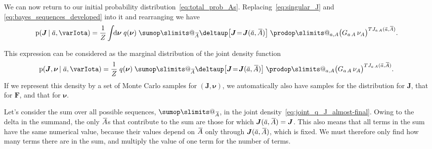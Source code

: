 \documentclass[\ifafour a4paper,12pt,\else a5paper,10pt,\fi%
onecolumn,oneside,article,%
british%
]{memoir}
\makeatletter
\theoremstyle{remark}
\theoremstyle{innote}
\def\sum{\DOTSI\sumop\slimits@}
\def\prod{\DOTSI\prodop\slimits@}
\newcommand*{\delt}{\deltaup}%
\newcommand*{\di}{\mathrm{d}}%
\newcommand*{\pf}{\mathrm{p}}%
\renewcommand*{\|}[1][]{\nonscript\,#1\vert\nonscript\;\mathopen{}}
\newcommand*{\widebar}[1]{{\mkern1.5mu\skew{2}\overline{\mkern-1.5mu#1\mkern-1.5mu}\mkern 1.5mu}}
\newcommand*{\yFF}{F}
\newcommand*{\yF}{\bm{\yFF}}
\newcommand*{\yAs}{\widebar{A}}%
\newcommand*{\yas}{\widebar{a}}%
\newcommand*{\yI}{\varIota}
\newcommand*{\yJJ}{J}
\newcommand*{\yJ}{\bm{\yJJ}}
\newcommand*{\ynuu}{\nu}
\newcommand*{\ynu}{\bm{\ynuu}}
\newcommand*{\yeq}{\mathrel{\!=\!}}
\makeatother
\begin{document}
\bigskip

We can now return to our initial probability
distribution~\eqref{eq:total_prob_As}. Replacing~\eqref{eq:singular_J} and
\eqref{eq:bayes_sequences_developed} into it and rearranging we have
\begin{equation}
  \label{eq:next-final_expression}
    \pf(\yJ \| \yas, \yI) =
  \frac{1}{Z}
  \int\!\!\di\ynu\;q(\ynu)\;
  \sum_{\yAs}\delt\bigl[\yJ \yeq \yJ(\yas,\yAs)\bigr]\;
  \prod_{a,A} \bigl(G_{a\,A}\,\nu_{A}\bigr)^{T J_{a\,A}(\yas,\yAs)}.
\end{equation}

This expression can be considered as the marginal distribution of the joint
density function
\begin{equation}
  \label{eq:joint_q_J_almost-final}
      \pf(\yJ, \ynu\| \yas, \yI) =
  \frac{1}{Z}\;
  q(\ynu)\;
  \sum_{\yAs}\delt\bigl[\yJ \yeq \yJ(\yas,\yAs)\bigr]\;
  \prod_{a,A} \bigl(G_{a\,A}\,\nu_{A}\bigr)^{T J_{a\,A}(\yas,\yAs)}.
\end{equation}
If we represent this density by a set of Monte Carlo samples for
$(\yJ,\ynu)$, we automatically also have samples for the distribution for
$\yJ$, that for $\yF$, and that for $\ynu$.




\medskip

Let's consider the sum over all possible sequences, $\sum_{\yAs}$, in the
joint density~\eqref{eq:joint_q_J_almost-final}. Owing to the delta in the
summand, the only $\yAs$s that contribute to the sum are those for which
$\yJ(\yas, \yAs)=\yJ$. This also means that all terms in the sum have the
same numerical value, because their values depend on $\yAs$ only through
$\yJ(\yas, \yAs)$, which is fixed. We must therefore only find how many
terms there are in the sum, and multiply the value of one term for the
number of terms.
\end{document}
